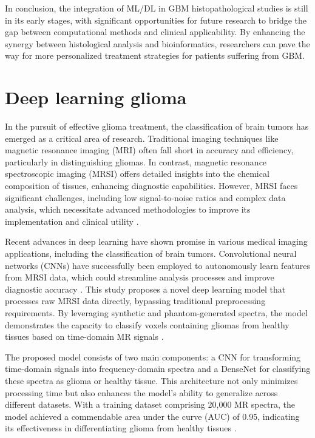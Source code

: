 \documentclass[runningheads]{llncs}
\begin{document}
In conclusion, the integration of ML/DL in GBM histopathological studies is still in its early stages, with significant opportunities for future research to bridge the gap between computational methods and clinical applicability. By enhancing the synergy between histological analysis and bioinformatics, researchers can pave the way for more personalized treatment strategies for patients suffering from GBM.
\section{Deep learning glioma}
In the pursuit of effective glioma treatment, the classification of brain tumors has emerged as a critical area of research. Traditional imaging techniques like magnetic resonance imaging (MRI) often fall short in accuracy and efficiency, particularly in distinguishing gliomas. In contrast, magnetic resonance spectroscopic imaging (MRSI) offers detailed insights into the chemical composition of tissues, enhancing diagnostic capabilities. However, MRSI faces significant challenges, including low signal-to-noise ratios and complex data analysis, which necessitate advanced methodologies to improve its implementation and clinical utility \cite{Erin_2025}.

Recent advances in deep learning have shown promise in various medical imaging applications, including the classification of brain tumors. Convolutional neural networks (CNNs) have successfully been employed to autonomously learn features from MRSI data, which could streamline analysis processes and improve diagnostic accuracy \cite{Erin_2025}. This study proposes a novel deep learning model that processes raw MRSI data directly, bypassing traditional preprocessing requirements. By leveraging synthetic and phantom-generated spectra, the model demonstrates the capacity to classify voxels containing gliomas from healthy tissues based on time-domain MR signals \cite{Erin_2025}.

The proposed model consists of two main components: a CNN for transforming time-domain signals into frequency-domain spectra and a DenseNet for classifying these spectra as glioma or healthy tissue. This architecture not only minimizes processing time but also enhances the model's ability to generalize across different datasets. With a training dataset comprising 20,000 MR spectra, the model achieved a commendable area under the curve (AUC) of 0.95, indicating its effectiveness in differentiating glioma from healthy tissues \cite{Erin_2025}.
\end{document}
